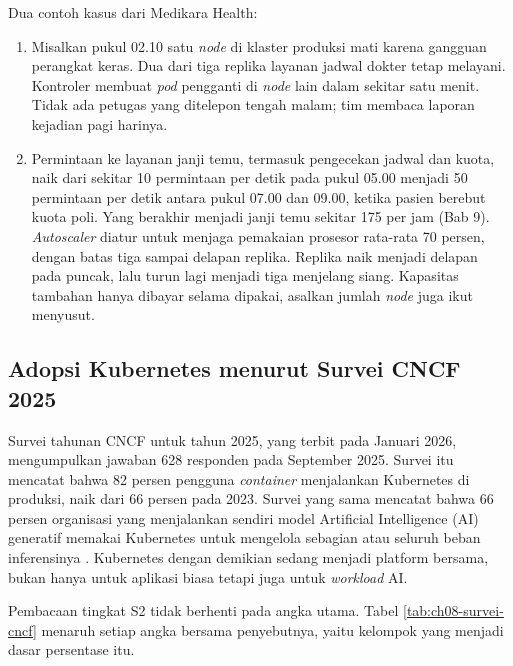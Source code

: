 Dua contoh kasus dari Medikara Health:
\begin{enumerate}
  \item Misalkan pukul 02.10 satu \textit{node} di klaster produksi mati karena gangguan perangkat
        keras. Dua dari tiga replika layanan jadwal dokter tetap melayani. Kontroler membuat
        \textit{pod} pengganti di \textit{node} lain dalam sekitar satu menit. Tidak ada petugas
        yang ditelepon tengah malam; tim membaca laporan kejadian pagi harinya.
  \item Permintaan ke layanan janji temu, termasuk pengecekan jadwal dan kuota, naik dari sekitar
        10 permintaan per detik pada pukul 05.00 menjadi 50 permintaan per detik antara pukul 07.00
        dan 09.00, ketika pasien berebut kuota poli. Yang berakhir menjadi janji temu sekitar 175
        per jam (Bab 9). \textit{Autoscaler} diatur untuk menjaga pemakaian prosesor rata-rata 70
        persen, dengan batas tiga sampai delapan replika. Replika naik menjadi delapan pada
        puncak, lalu turun lagi menjadi tiga menjelang siang. Kapasitas tambahan hanya dibayar
        selama dipakai, asalkan jumlah \textit{node} juga ikut menyusut.
\end{enumerate}

\subsection{Adopsi Kubernetes menurut Survei CNCF 2025}

Survei tahunan CNCF untuk tahun 2025, yang terbit pada Januari 2026, mengumpulkan jawaban 628
responden pada September 2025. Survei itu mencatat bahwa 82 persen pengguna \textit{container}
menjalankan Kubernetes di produksi, naik dari 66 persen pada 2023. Survei yang sama mencatat bahwa
66 persen organisasi yang menjalankan sendiri model Artificial Intelligence (AI) generatif memakai
Kubernetes untuk mengelola sebagian atau seluruh beban inferensinya
\cite{cncf-survey2025,c08-cncf-announce2026}. Kubernetes dengan demikian sedang menjadi platform
bersama, bukan hanya untuk aplikasi biasa tetapi juga untuk \textit{workload} AI.

Pembacaan tingkat S2 tidak berhenti pada angka utama. Tabel \ref{tab:ch08-survei-cncf} menaruh
setiap angka bersama penyebutnya, yaitu kelompok yang menjadi dasar persentase itu.

